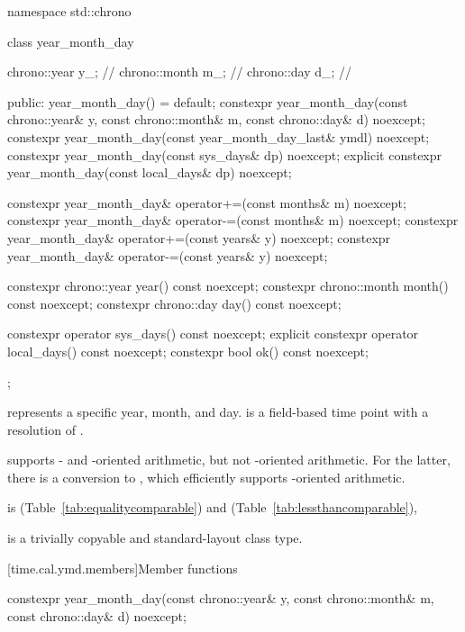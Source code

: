 \begin{codeblock}
namespace std::chrono {
  class year_month_day {
    chrono::year  y_;           // \expos
    chrono::month m_;           // \expos
    chrono::day   d_;           // \expos

  public:
    year_month_day() = default;
    constexpr year_month_day(const chrono::year& y, const chrono::month& m,
                             const chrono::day& d) noexcept;
    constexpr year_month_day(const year_month_day_last& ymdl) noexcept;
    constexpr year_month_day(const sys_days& dp) noexcept;
    explicit constexpr year_month_day(const local_days& dp) noexcept;

    constexpr year_month_day& operator+=(const months& m) noexcept;
    constexpr year_month_day& operator-=(const months& m) noexcept;
    constexpr year_month_day& operator+=(const years& y)  noexcept;
    constexpr year_month_day& operator-=(const years& y)  noexcept;

    constexpr chrono::year  year()  const noexcept;
    constexpr chrono::month month() const noexcept;
    constexpr chrono::day   day()   const noexcept;

    constexpr          operator sys_days()   const noexcept;
    explicit constexpr operator local_days() const noexcept;
    constexpr bool ok() const noexcept;
  };
}
\end{codeblock}

\pnum
{} represents a specific year, month, and day.
 is a field-based time point with a resolution of .
\begin{note}
 supports - and -oriented arithmetic,
but not -oriented arithmetic.
For the latter, there is a conversion to ,
which efficiently supports -oriented arithmetic.
\end{note}
 is  (Table~\ref{tab:equalitycomparable})
and  (Table~\ref{tab:lessthancomparable}),

\pnum
{} is a trivially copyable and standard-layout class type.

[time.cal.ymd.members]{Member functions}

%
\begin{itemdecl}
constexpr year_month_day(const chrono::year& y, const chrono::month& m,
                         const chrono::day& d) noexcept;
\end{itemdecl}

